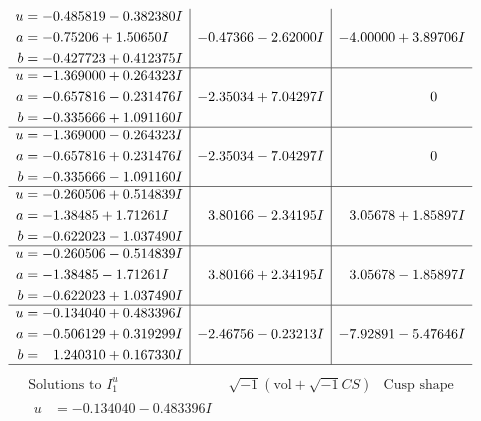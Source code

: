 \documentclass[1p]{elsarticle_modified}
\theoremstyle{definition}
\newcommand{\I}{\sqrt{-1}}
\begin{document}
$$\begin{array}{c|c|c}
\begin{aligned}
u &= -0.485819 - 0.382380 I \\
a &= -0.75206 + 1.50650 I \\
b &= -0.427723 + 0.412375 I\end{aligned}
 & -0.47366 - 2.62000 I & -4.00000 + 3.89706 I \\ \hline\begin{aligned}
u &= -1.369000 + 0.264323 I \\
a &= -0.657816 - 0.231476 I \\
b &= -0.335666 + 1.091160 I\end{aligned}
 & -2.35034 + 7.04297 I & \phantom{-0.000000 } 0 \\ \hline\begin{aligned}
u &= -1.369000 - 0.264323 I \\
a &= -0.657816 + 0.231476 I \\
b &= -0.335666 - 1.091160 I\end{aligned}
 & -2.35034 - 7.04297 I & \phantom{-0.000000 } 0 \\ \hline\begin{aligned}
u &= -0.260506 + 0.514839 I \\
a &= -1.38485 + 1.71261 I \\
b &= -0.622023 - 1.037490 I\end{aligned}
 & \phantom{-}3.80166 - 2.34195 I & \phantom{-}3.05678 + 1.85897 I \\ \hline\begin{aligned}
u &= -0.260506 - 0.514839 I \\
a &= -1.38485 - 1.71261 I \\
b &= -0.622023 + 1.037490 I\end{aligned}
 & \phantom{-}3.80166 + 2.34195 I & \phantom{-}3.05678 - 1.85897 I \\ \hline\begin{aligned}
u &= -0.134040 + 0.483396 I \\
a &= -0.506129 + 0.319299 I \\
b &= \phantom{-}1.240310 + 0.167330 I\end{aligned}
 & -2.46756 - 0.23213 I & -7.92891 - 5.47646 I\\
 \hline 
 \end{array}$$\newpage$$\begin{array}{c|c|c}  
\text{Solutions to }I^u_{1}& \I (\text{vol} + \sqrt{-1}CS) & \text{Cusp shape}\\
 \hline 
\begin{aligned}
u &= -0.134040 - 0.483396 I \\

\end{aligned}
\end{array}$$
\end{document}
